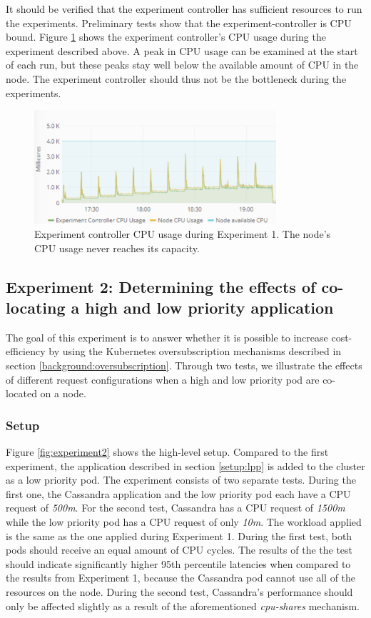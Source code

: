 It should be verified that the experiment controller has sufficient resources to run the experiments. Preliminary tests show that the experiment-controller is CPU bound. Figure \ref{fig:cpu-scalar} shows the experiment controller's CPU usage during the experiment described above. A peak in CPU usage can be examined at the start of each run, but these peaks stay well below the available amount of CPU in the node. The experiment controller should thus not be the bottleneck during the experiments. \\

\setlength\abovecaptionskip{3pt}
\begin{figure}[h]
\centering
\includegraphics[width=0.80\textwidth]{Images/Experiments/CPU/Grafana/cpu-scalar.PNG}
\caption{Experiment controller CPU usage during Experiment 1. The node's CPU usage never reaches its capacity.}
\label{fig:cpu-scalar} 
\end{figure}

\subsection{Experiment 2: Determining the effects of co-locating a high and low priority application}
The goal of this experiment is to answer whether it is possible to increase cost-efficiency by using the Kubernetes oversubscription mechanisms described in section \ref{background:oversubscription}. Through two tests, we illustrate the effects of different request configurations when a high and low priority pod are co-located on a node.

\subsubsection{Setup}
Figure \ref{fig:experiment2} shows the high-level setup. Compared to the first experiment, the application described in section \ref{setup:lpp} is added to the cluster as a low priority pod. The experiment consists of two separate tests. During the first one, the Cassandra application and the low priority pod each have a CPU request of \textit{500m}. For the second test, Cassandra has a CPU request of \textit{1500m} while the low priority pod has a CPU request of only \textit{10m}. The workload applied is the same as the one applied during Experiment 1. During the first test, both pods should receive an equal amount of CPU cycles. The results of the the test should indicate significantly higher 95th percentile latencies when compared to the results from Experiment 1, because the Cassandra pod cannot use all of the resources on the node. During the second test, Cassandra's performance should only be affected slightly as a result of the aforementioned \textit{cpu-shares} mechanism.

